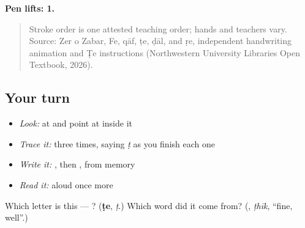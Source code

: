 \textbf{Pen lifts: 1.}

\begin{quote}
Stroke order is one attested teaching order; hands and teachers vary. Source: Zer o Zabar, Fe, qāf, ṭe, ḍāl, and ṛe, independent  handwriting animation and Ṭe instructions (Northwestern University Libraries Open Textbook, 2026).
\end{quote}

\subsection*{Your turn}
\begin{itemize}
\raggedright
  \item \emph{Look:} at \textbf{} and point at  inside it
  \item \emph{Trace it:}  three times, saying \emph{ṭ} as you finish each one
  \item \emph{Write it:} , then , from memory
  \item \emph{Read it:} \textbf{} aloud once more
\end{itemize}

\begin{tcolorbox}[breakable,colback=teal!4,colframe=teal!35!black,title={Before you move on}]
Which letter is this — ? (\textbf{ṭe}, \emph{ṭ}.) Which word did it come from? (\textbf{}, \emph{ṭhīk}, \textquotedblleft{}fine, well\textquotedblright{}.)
\end{tcolorbox}
